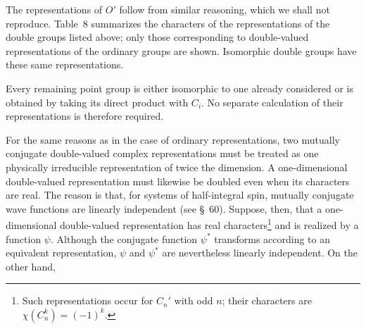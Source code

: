The representations of $O'$ follow from similar reasoning, which we shall not reproduce. Table~8 summarizes the characters of the representations of the double groups listed above; only those corresponding to double-valued representations of the ordinary groups are shown. Isomorphic double groups have these same representations.

Every remaining point group is either isomorphic to one already considered or is obtained by taking its direct product with $C_i$. No separate calculation of their representations is therefore required.

For the same reasons as in the case of ordinary representations, two mutually conjugate double-valued complex representations must be treated as one physically irreducible representation of twice the dimension. A one-dimensional double-valued representation must likewise be doubled even when its characters are real. The reason is that, for systems of half-integral spin, mutually conjugate wave functions are linearly independent (see \S~60). Suppose, then, that a one-dimensional double-valued representation has real characters\footnote{Such representations occur for $C_n'$ with odd $n$; their characters are $\chi(C_n^k)=(-1)^k$.} and is realized by a function $\psi$. Although the conjugate function $\psi^*$ transforms according to an equivalent representation, $\psi$ and $\psi^*$ are nevertheless linearly independent. On the other hand,

